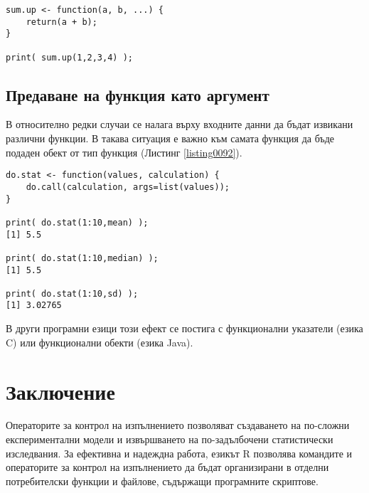 \begin{lstlisting}[caption=Връщане на стойност от функция, label=listing0091]
sum.up <- function(a, b, ...) {
	return(a + b);
}

print( sum.up(1,2,3,4) );
\end{lstlisting}

\subsection{Предаване на функция като аргумент}

В относително редки случаи се налага върху входните данни да бъдат извикани различни функции. В такава ситуация е важно към самата функция да бъде подаден обект от тип функция (Листинг \ref{listing0092}).

\begin{lstlisting}[caption=Избор на функция за извикване по време на изпълнение, label=listing0092]
do.stat <- function(values, calculation) {
	do.call(calculation, args=list(values));
}

print( do.stat(1:10,mean) );
[1] 5.5

print( do.stat(1:10,median) );
[1] 5.5

print( do.stat(1:10,sd) );
[1] 3.02765
\end{lstlisting}

В други програмни езици този ефект се постига с функционални указатели (езика C) или функционални обекти (езика Java).

\section*{Заключение}

Операторите за контрол на изпълнението позволяват създаването на по-сложни експериментални модели и извършването на по-задълбочени статистически изследвания. За ефективна и надеждна работа, езикът R позволява командите и операторите за контрол на изпълнението да бъдат организирани в отделни потребителски функции и файлове, съдържащи програмните скриптове.

